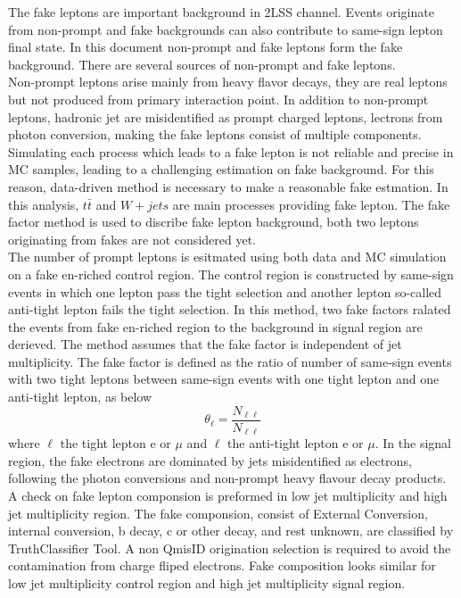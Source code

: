 The fake leptons are important background in 2LSS channel. Events originate from non-prompt and fake backgrounds can also contribute to same-sign lepton final state. In this document non-prompt and fake leptons form the fake background. There are several sources of non-prompt and fake leptons.\\
	Non-prompt leptons arise mainly from  heavy flavor decays, they are real leptons but not produced from primary interaction point. In addition to non-prompt leptons, hadronic jet are misidentified as prompt charged leptons, lectrons from photon conversion, making the fake leptons consist of multiple components.\\ 
	Simulating each process which leads to a fake lepton is not reliable and precise in MC samples, leading to a challenging estimation on fake background. For this reason, data-driven method is necessary to make a reasonable fake estmation. In this analysis, $t\bar{t}$  and $W+jets$ are main processes providing fake lepton. The fake factor method is used to discribe fake lepton background, both two leptons originating from fakes are not considered yet.\\
	The number of prompt leptons is esitmated using both data and MC simulation on a fake en-riched control region. The control region is constructed by same-sign events in which one lepton pass the tight selection and another lepton so-called anti-tight lepton fails the tight selection. In this method, two fake factors ralated the events from fake en-riched region to the background in signal region are derieved. The method assumes that the fake factor is independent of jet multiplicity. The fake factor is defined as the ratio of number of same-sign events with two tight leptons between same-sign events with one tight lepton and one anti-tight lepton, as below
\begin{equation}
\theta_{\ell}=\frac{N_{\ell \ell}}{N_{\ell \ell}}
\end{equation}
where $\ell$ the tight lepton e or $\mu$ and $\ell$ the anti-tight lepton e or $\mu$. In the signal region, the fake electrons are dominated by jets misidentified as electrons, following the photon conversions and non-prompt heavy flavour decay products. A check on fake lepton componsion is preformed in low jet multiplicity and high jet multiplicity region. The fake componsion, consist of External Conversion, internal conversion, b decay, c or other decay, and rest unknown, are classified by TruthClassifier Tool. A non QmisID origination selection is required to avoid the contamination from charge fliped electrons. Fake composition	looks similar for low jet multiplicity control region and high jet multiplicity signal region.


